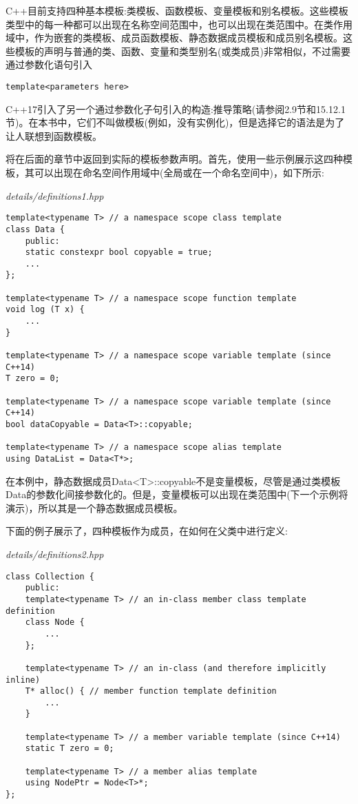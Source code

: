 
C++目前支持四种基本模板:类模板、函数模板、变量模板和别名模板。这些模板类型中的每一种都可以出现在名称空间范围中，也可以出现在类范围中。在类作用域中，作为嵌套的类模板、成员函数模板、静态数据成员模板和成员别名模板。这些模板的声明与普通的类、函数、变量和类型别名(或类成员)非常相似，不过需要通过参数化语句引入

\begin{lstlisting}[style=styleCXX]
template<parameters here>
\end{lstlisting}

C++17引入了另一个通过参数化子句引入的构造:推导策略(请参阅2.9节和15.12.1节)。在本书中，它们不叫做模板(例如，没有实例化)，但是选择它的语法是为了让人联想到函数模板。

将在后面的章节中返回到实际的模板参数声明。首先，使用一些示例展示这四种模板，其可以出现在命名空间作用域中(全局或在一个命名空间中)，如下所示:

\noindent
\textit{details/definitions1.hpp}
\begin{lstlisting}[style=styleCXX]
template<typename T> // a namespace scope class template
class Data {
	public:
	static constexpr bool copyable = true;
	...
};

template<typename T> // a namespace scope function template
void log (T x) {
	...
}

template<typename T> // a namespace scope variable template (since C++14)
T zero = 0;

template<typename T> // a namespace scope variable template (since C++14)
bool dataCopyable = Data<T>::copyable;

template<typename T> // a namespace scope alias template
using DataList = Data<T*>;
\end{lstlisting}

在本例中，静态数据成员Data<T>::copyable不是变量模板，尽管是通过类模板Data的参数化间接参数化的。但是，变量模板可以出现在类范围中(下一个示例将演示)，所以其是一个静态数据成员模板。

下面的例子展示了，四种模板作为成员，在如何在父类中进行定义:

\noindent
\textit{details/definitions2.hpp}
\begin{lstlisting}[style=styleCXX]
class Collection {
	public:
	template<typename T> // an in-class member class template definition
	class Node {
		...
	};

	template<typename T> // an in-class (and therefore implicitly inline)
	T* alloc() { // member function template definition
		...
	}

	template<typename T> // a member variable template (since C++14)
	static T zero = 0;
	
	template<typename T> // a member alias template
	using NodePtr = Node<T>*;
};
\end{lstlisting}

